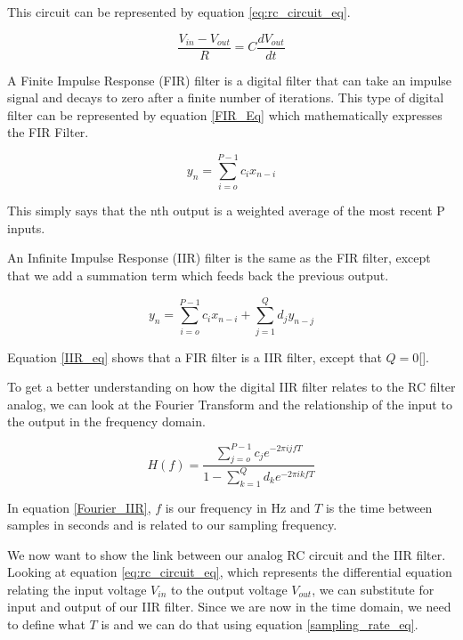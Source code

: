This circuit can be represented by equation \ref{eq:rc_circuit_eq}.

\begin{equation}\label{eq:rc_circuit_eq}
\frac{V_{in}-V_{out}}{R}=C\frac{dV_{out}}{dt}
\end{equation}

A Finite Impulse Response (FIR) filter is a digital filter that can take an impulse signal and decays to zero after a finite number of iterations.  This type of digital filter can be represented by equation \ref{FIR_Eq} which mathematically expresses the FIR Filter.

\begin{equation}\label{FIR_Eq}
y_n=\displaystyle\sum\limits_{i=o}^{P-1} c_ix_{n-i}
\end{equation}

This simply says that the nth output is a weighted average of the most recent P inputs.  

An Infinite Impulse Response (IIR) filter is the same as the FIR filter, except that we add a summation term which feeds back the previous output.

\begin{equation}\label{IIR_eq}
y_n=\displaystyle\sum\limits_{i=o}^{P-1} c_ix_{n-i}+\displaystyle\sum\limits_{j=1}^{Q} d_jy_{n-j}
\end{equation}

Equation \ref{IIR_eq} shows that a FIR filter is a IIR filter, except that $Q=0$[\cite{Cross}].  

To get a better understanding on how the digital IIR filter relates to the RC filter analog, we can look at the Fourier Transform and the relationship of the input to the output in the frequency domain.

\begin{equation}\label{Fourier_IIR}
H(f)=\frac{\displaystyle\sum\limits_{j=o}^{P-1} c_je^{-2\pi ijfT}}{1-\displaystyle\sum\limits_{k=1}^{Q} d_ke^{-2\pi ikfT}}
\end{equation}

In equation \ref{Fourier_IIR}, $f$ is our frequency in Hz and $T$ is the time between samples in seconds and is related to our sampling frequency.

We now want to show the link between our analog RC circuit and the IIR filter.  Looking at equation \ref{eq:rc_circuit_eq}, which represents the differential equation relating the input voltage $V_{in}$ to the output voltage $V_{out}$, we can substitute for input and output of our IIR filter.  Since we are now in the time domain, we need to define what $T$ is and we can do that using equation \ref{sampling_rate_eq}.

